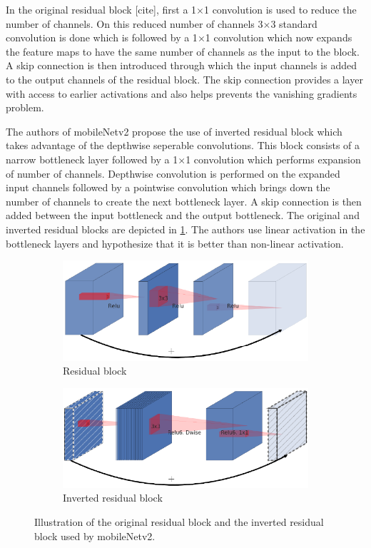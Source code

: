 In the original residual block [cite], first a 1$\times$1 convolution is used to reduce the number of channels. On this reduced number of channels 3$\times$3 standard convolution is done which is followed by a 1$\times$1 convolution which now expands the feature maps to have the same number of channels as the input to the block. A skip connection is then introduced through which the input channels is added to the output channels of the residual block. The skip connection provides a layer with access to earlier activations and also helps prevents the vanishing gradients problem. 

The authors of mobileNetv2 propose the use of inverted residual block which takes advantage of the depthwise seperable convolutions. This block consists of a narrow bottleneck layer followed by a 1$\times$1 convolution which performs expansion of number of channels. Depthwise convolution is performed on the expanded input channels followed by a pointwise convolution which brings down the number of channels to create the next bottleneck layer. A skip connection is then added between the input bottleneck and the output bottleneck. The original and inverted residual blocks are depicted in \ref{Fig:residual}. The authors use linear activation in the bottleneck layers and hypothesize that it is better than non-linear activation.

	\begin{figure}[!htb]
		\begin{subfigure}{.5\textwidth}
			\centering
			\includegraphics[width=.8\linewidth]{images/residual}
			\caption{Residual block}
		\end{subfigure}
		\begin{subfigure}{.5\textwidth}
			\centering
			\includegraphics[width=.8\linewidth]{images/inverted_residual}
			\caption{Inverted residual block}
		\end{subfigure}
		\caption{Illustration of the original residual block and the inverted residual block used by mobileNetv2.}
		\label{Fig:residual}
	\end{figure}


